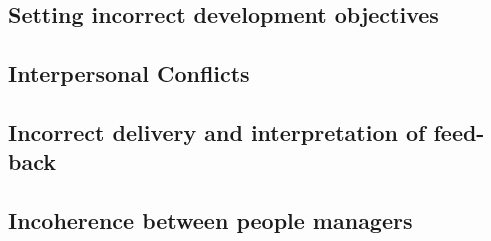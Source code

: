 \subsection{Setting incorrect development objectives}
\label{sub-sec:devobjectives}
\newline

\subsection{Interpersonal Conflicts}
\label{sub-sec:conflicts}
\newline

\subsection{Incorrect delivery and interpretation of feed-back}
\label{sub-sec:incorrectfeedback}
\newline

\subsection{Incoherence between people managers}
\label{sub-sec:incoherence}
\newline

